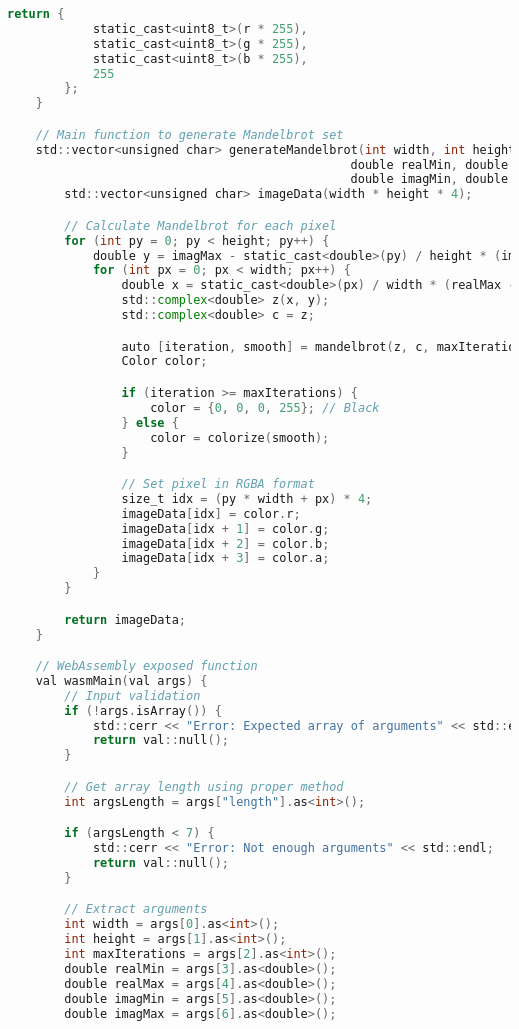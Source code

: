 \begin{lstlisting}[language=go, frame=tb, caption={Mandelbrot Set Calculation: C++ (WASM build)}]
        return {
            static_cast<uint8_t>(r * 255),
            static_cast<uint8_t>(g * 255),
            static_cast<uint8_t>(b * 255),
            255
        };
    }

    // Main function to generate Mandelbrot set
    std::vector<unsigned char> generateMandelbrot(int width, int height, int maxIterations,
                                                double realMin, double realMax,
                                                double imagMin, double imagMax) {
        std::vector<unsigned char> imageData(width * height * 4);

        // Calculate Mandelbrot for each pixel
        for (int py = 0; py < height; py++) {
            double y = imagMax - static_cast<double>(py) / height * (imagMax - imagMin);
            for (int px = 0; px < width; px++) {
                double x = static_cast<double>(px) / width * (realMax - realMin) + realMin;
                std::complex<double> z(x, y);
                std::complex<double> c = z;

                auto [iteration, smooth] = mandelbrot(z, c, maxIterations);
                Color color;

                if (iteration >= maxIterations) {
                    color = {0, 0, 0, 255}; // Black
                } else {
                    color = colorize(smooth);
                }

                // Set pixel in RGBA format
                size_t idx = (py * width + px) * 4;
                imageData[idx] = color.r;
                imageData[idx + 1] = color.g;
                imageData[idx + 2] = color.b;
                imageData[idx + 3] = color.a;
            }
        }

        return imageData;
    }

    // WebAssembly exposed function
    val wasmMain(val args) {
        // Input validation
        if (!args.isArray()) {
            std::cerr << "Error: Expected array of arguments" << std::endl;
            return val::null();
        }

        // Get array length using proper method
        int argsLength = args["length"].as<int>();

        if (argsLength < 7) {
            std::cerr << "Error: Not enough arguments" << std::endl;
            return val::null();
        }

        // Extract arguments
        int width = args[0].as<int>();
        int height = args[1].as<int>();
        int maxIterations = args[2].as<int>();
        double realMin = args[3].as<double>();
        double realMax = args[4].as<double>();
        double imagMin = args[5].as<double>();
        double imagMax = args[6].as<double>();


\end{lstlisting}
